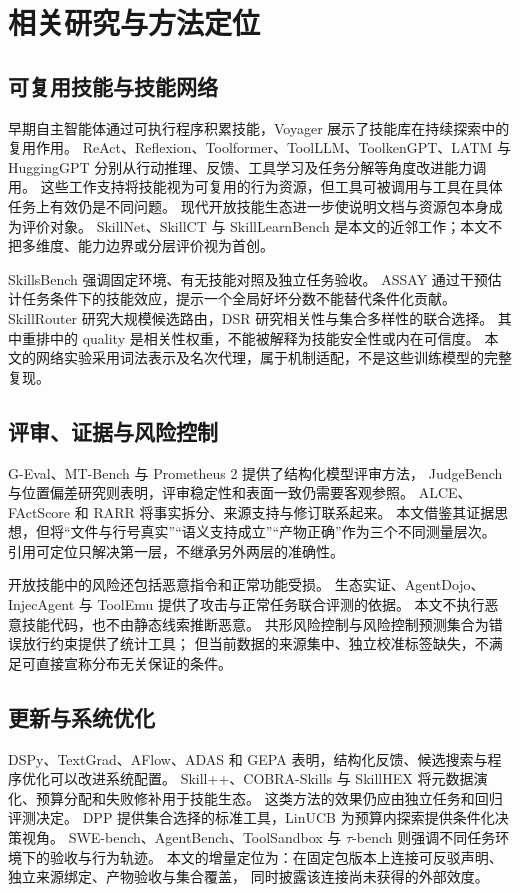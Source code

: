 \section{相关研究与方法定位}
\subsection{可复用技能与技能网络}
早期自主智能体通过可执行程序积累技能，Voyager 展示了技能库在持续探索中的复用作用\citep{P11}。
ReAct、Reflexion、Toolformer、ToolLLM、ToolkenGPT、LATM 与 HuggingGPT 分别从行动推理、反馈、工具学习及任务分解等角度改进能力调用\citep{P12,P13,P14,P15,P16,P17,P18}。
这些工作支持将技能视为可复用的行为资源，但工具可被调用与工具在具体任务上有效仍是不同问题。
现代开放技能生态进一步使说明文档与资源包本身成为评价对象。
SkillNet、SkillCT 与 SkillLearnBench 是本文的近邻工作；本文不把多维度、能力边界或分层评价视为首创\citep{P01,P43,P44}。

SkillsBench 强调固定环境、有无技能对照及独立任务验收\citep{P02}。
ASSAY 通过干预估计任务条件下的技能效应，提示一个全局好坏分数不能替代条件化贡献\citep{P03}。
SkillRouter 研究大规模候选路由，DSR 研究相关性与集合多样性的联合选择\citep{P04,P05}。
其中重排中的 quality 是相关性权重，不能被解释为技能安全性或内在可信度。
本文的网络实验采用词法表示及名次代理，属于机制适配，不是这些训练模型的完整复现。

\subsection{评审、证据与风险控制}
G-Eval、MT-Bench 与 Prometheus 2 提供了结构化模型评审方法\citep{P24,P25,P26}，
JudgeBench 与位置偏差研究则表明，评审稳定性和表面一致仍需要客观参照\citep{P27,P28}。
ALCE、FActScore 和 RARR 将事实拆分、来源支持与修订联系起来\citep{P39,P40,P41}。
本文借鉴其证据思想，但将“文件与行号真实”“语义支持成立”“产物正确”作为三个不同测量层次。
引用可定位只解决第一层，不继承另外两层的准确性。

开放技能中的风险还包括恶意指令和正常功能受损。
生态实证、AgentDojo、InjecAgent 与 ToolEmu 提供了攻击与正常任务联合评测的依据\citep{P09,P10,P29,P30,P31}。
本文不执行恶意技能代码，也不由静态线索推断恶意。
共形风险控制与风险控制预测集合为错误放行约束提供了统计工具\citep{P36,P37}；
但当前数据的来源集中、独立校准标签缺失，不满足可直接宣称分布无关保证的条件。

\subsection{更新与系统优化}
DSPy、TextGrad、AFlow、ADAS 和 GEPA 表明，结构化反馈、候选搜索与程序优化可以改进系统配置\citep{P19,P20,P21,P22,P23}。
Skill++、COBRA-Skills 与 SkillHEX 将元数据演化、预算分配和失败修补用于技能生态\citep{P06,P07,P08}。
这类方法的效果仍应由独立任务和回归评测决定。
DPP 提供集合选择的标准工具，LinUCB 为预算内探索提供条件化决策视角\citep{P38,P42}。
SWE-bench、AgentBench、ToolSandbox 与 $\tau$-bench 则强调不同任务环境下的验收与行为轨迹\citep{P32,P33,P34,P35}。
本文的增量定位为：在固定包版本上连接可反驳声明、独立来源绑定、产物验收与集合覆盖，
同时披露该连接尚未获得的外部效度。
